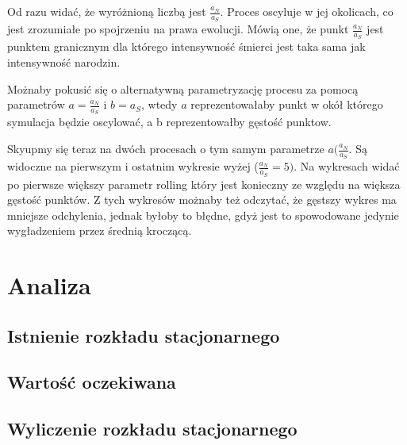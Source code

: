 \documentclass{article}
\begin{document}
Od razu widać, że wyróżnioną liczbą jest $\frac{a_N}{a_S}$. Proces oscyluje w jej okolicach, co jest zrozumiałe po spojrzeniu na prawa ewolucji. Mówią one, że punkt $\frac{a_N}{a_S}$ jest punktem granicznym dla którego intensywność śmierci jest taka sama jak intensywność narodzin. 

Możnaby pokusić się o alternatywną parametryzację procesu za pomocą parametrów $a = \frac{a_N}{a_S}$ i $b = a_S$, wtedy $a$ reprezentowałaby punkt w okół którego symulacja będzie oscylować, a b reprezentowałby gęstość punktow.

Skyupmy się teraz na dwóch procesach o tym samym parametrze $a (\frac{a_N}{a_S}$. Są widoczne na pierwszym i ostatnim wykresie wyżej ($\frac{a_N}{a_S} = 5)$. Na wykresach widać po pierwsze większy parametr rolling który jest konieczny ze względu na większa gęstość punktów. Z tych wykresów możnaby też odczytać, że gęstszy wykres ma mniejsze odchylenia, jednak byłoby to błędne, gdyż jest to spowodowane jedynie wygładzeniem przez średnią kroczącą.
\section{Analiza}
\subsection{Istnienie rozkładu stacjonarnego}
\subsection{Wartość oczekiwana}
\subsection{Wyliczenie rozkładu stacjonarnego}
\end{document}
